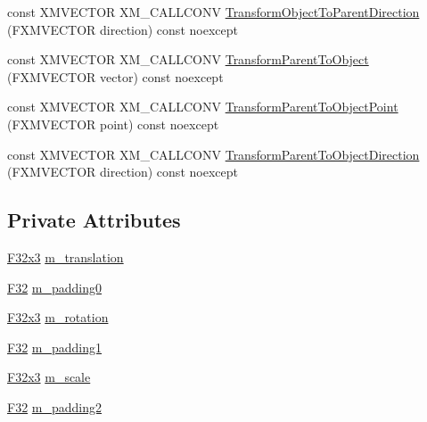 \begin{DoxyCompactItemize}
\item 
const X\+M\+V\+E\+C\+T\+OR X\+M\+\_\+\+C\+A\+L\+L\+C\+O\+NV \mbox{\hyperlink{classmage_1_1_s_e_t_transform3_d_a3f6dac1778bc2c72a1bc183f117c045e}{Transform\+Object\+To\+Parent\+Direction}} (F\+X\+M\+V\+E\+C\+T\+OR direction) const noexcept
\item 
const X\+M\+V\+E\+C\+T\+OR X\+M\+\_\+\+C\+A\+L\+L\+C\+O\+NV \mbox{\hyperlink{classmage_1_1_s_e_t_transform3_d_a37334962b69953ef4884342e1ff343d0}{Transform\+Parent\+To\+Object}} (F\+X\+M\+V\+E\+C\+T\+OR vector) const noexcept
\item 
const X\+M\+V\+E\+C\+T\+OR X\+M\+\_\+\+C\+A\+L\+L\+C\+O\+NV \mbox{\hyperlink{classmage_1_1_s_e_t_transform3_d_af933d681de001a8743490bdc4cc23345}{Transform\+Parent\+To\+Object\+Point}} (F\+X\+M\+V\+E\+C\+T\+OR point) const noexcept
\item 
const X\+M\+V\+E\+C\+T\+OR X\+M\+\_\+\+C\+A\+L\+L\+C\+O\+NV \mbox{\hyperlink{classmage_1_1_s_e_t_transform3_d_a021c5832dd165db20d984c8e53315dc9}{Transform\+Parent\+To\+Object\+Direction}} (F\+X\+M\+V\+E\+C\+T\+OR direction) const noexcept
\end{DoxyCompactItemize}
\subsection*{Private Attributes}
\begin{DoxyCompactItemize}
\item 
\mbox{\hyperlink{namespacemage_a1e3c7a882af461f161caa1cbddaf1fa2}{F32x3}} \mbox{\hyperlink{classmage_1_1_s_e_t_transform3_d_ab93c4f34261dc89318fadf8855014c91}{m\+\_\+translation}}
\item 
\mbox{\hyperlink{namespacemage_aa97e833b45f06d60a0a9c4fc22ae02c0}{F32}} \mbox{\hyperlink{classmage_1_1_s_e_t_transform3_d_a75ca9513340d15c98afd79674637d384}{m\+\_\+padding0}}
\item 
\mbox{\hyperlink{namespacemage_a1e3c7a882af461f161caa1cbddaf1fa2}{F32x3}} \mbox{\hyperlink{classmage_1_1_s_e_t_transform3_d_a6d08d69191534755f33d33430c671c3d}{m\+\_\+rotation}}
\item 
\mbox{\hyperlink{namespacemage_aa97e833b45f06d60a0a9c4fc22ae02c0}{F32}} \mbox{\hyperlink{classmage_1_1_s_e_t_transform3_d_aa5508fc722eff45b82130420ada1247f}{m\+\_\+padding1}}
\item 
\mbox{\hyperlink{namespacemage_a1e3c7a882af461f161caa1cbddaf1fa2}{F32x3}} \mbox{\hyperlink{classmage_1_1_s_e_t_transform3_d_a5606af352e72e81d86fcee652fd5a432}{m\+\_\+scale}}
\item 
\mbox{\hyperlink{namespacemage_aa97e833b45f06d60a0a9c4fc22ae02c0}{F32}} \mbox{\hyperlink{classmage_1_1_s_e_t_transform3_d_a4bae6e9caba306e0890492a1ebdbd8b5}{m\+\_\+padding2}}
\end{DoxyCompactItemize}


